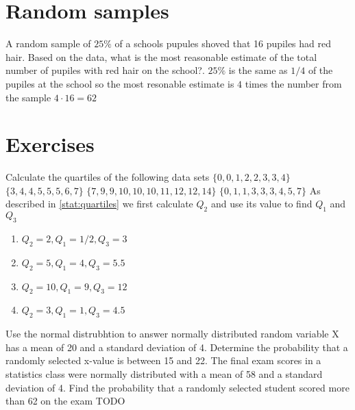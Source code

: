 \section{Random samples}
A random sample of $25\%$ of a schools pupules shoved that 16 pupiles had red hair. Based on the data, what is the most reasonable estimate of the total number of pupiles with red hair on the school?. $25\%$ is the same as $1/4$ of the pupiles at the school so the most resonable estimate is $4$ times the number from the sample $4 \cdot 16 = 62$

\section{Exercises}
\begin{ExerciseList}


\Exercise Calculate the quartiles of the following data sets
\Question $\{0, 0, 1, 2, 2, 3, 3, 4\}$
\Question $\{3, 4, 4, 5, 5, 5, 6, 7\}$
\Question $\{7, 9, 9, 10, 10, 10, 11, 12, 12, 14\}$
\Question $\{0, 1, 1, 3, 3, 3, 4, 5, 7\}$
\Answer As described in \ref{stat:quartiles} we first calculate $Q_2$ and use its value to find $Q_1$ and $Q_3$
\begin{enumerate}
\item \myindent $Q_2 = 2, Q_1 = 1/2, Q_3 = 3$
\item \myindent $Q_2 = 5, Q_1 = 4, Q_3 = 5.5$
\item \myindent $Q_2 = 10, Q_1 = 9, Q_3 = 12$
\item \myindent $Q_2 = 3, Q_1 = 1, Q_3 = 4.5$
\end{enumerate}

\Exercise Use the normal distrubhtion to answer
\Question normally distributed random variable X has a mean of 20 and a standard deviation of 4. Determine the probability that a randomly selected x-value is between 15 and 22.
\Question The final exam scores in a statistics class were normally distributed with a mean of 58 and a standard deviation of 4. Find the probability that a randomly selected student scored more than 62 on the exam
\Answer TODO

\end{ExerciseList}
